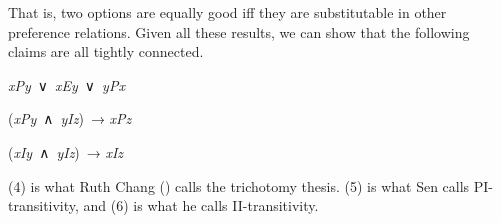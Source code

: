 \documentclass[
  10.5pt,
  twoside]{article}
\providecommand{\tightlist}{%
  \setlength{\itemsep}{0pt}\setlength{\parskip}{0pt}}
\let\oldenumerate\enumerate
\let\endoldenumerate\endenumerate
\renewenvironment{enumerate}
  {\vskip 5pt\oldenumerate}
  {\endoldenumerate\vskip 5pt}
\begin{document}
That is, two options are equally good iff they are substitutable in
other preference relations. Given all these results, we can show that
the following claims are all tightly connected.

\begin{enumerate}
\def\labelenumi{(\arabic{enumi})}
\setcounter{enumi}{3}
\tightlist
\item
  \emph{xPy}~∨~\emph{xEy}~∨~\emph{yPx}
\item
  (\emph{xPy}~∧~\emph{yIz})~→ \emph{xPz}
\item
  (\emph{xIy}~∧~\emph{yIz})~→ \emph{xIz}
\end{enumerate}

(4) is what Ruth Chang () calls the
trichotomy thesis. (5) is what Sen calls PI-transitivity, and (6) is
what he calls II-transitivity.
\end{document}
